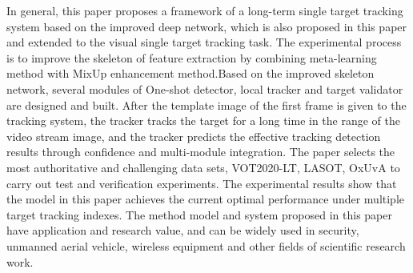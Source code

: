 \documentclass[promaster]{thesis-uestc}
\begin{document}
\begin{englishabstract}
In general, this paper proposes a framework of a long-term single target tracking system based on the improved deep network, which is also proposed in this paper and extended to the visual single target tracking task.
The experimental process is to improve the skeleton of feature extraction by combining meta-learning method with MixUp enhancement method.Based on the improved skeleton network, several modules of One-shot detector, local tracker and target validator are designed and built.
After the template image of the first frame is given to the tracking system, the tracker tracks the target for a long time in the range of the video stream image, and the tracker predicts the effective tracking detection results through confidence and multi-module integration.
The paper selects the most authoritative and challenging data sets, VOT2020-LT, LASOT, OxUvA to carry out test and
verification experiments. The experimental results show that the model in this paper achieves the current optimal performance under multiple target tracking indexes. 
The method model and system proposed in this paper have application and research value, 
and can be widely used in security, unmanned aerial vehicle, wireless equipment and other fields of scientific research work.



\end{englishabstract}

\thesistableofcontents


\thesischapterexordium
\end{document}
